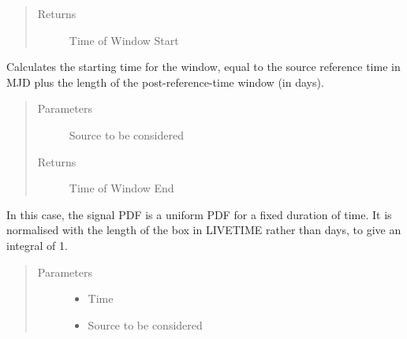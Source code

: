 \documentclass[letterpaper,10pt,english]{sphinxmanual}
\begin{document}
\begin{fulllineitems}
\begin{fulllineitems}
\begin{quote}
\begin{description}
\item[{Returns}] \leavevmode
Time of Window Start

\end{description}\end{quote}

\end{fulllineitems}


\begin{fulllineitems}
\label{\detokenize{index:flarestack.core.time_pdf.Box.sig_t1}}
Calculates the starting time for the window, equal to the
source reference time in MJD plus the length of the post-reference-time
window (in days).
\begin{quote}\begin{description}
\item[{Parameters}] \leavevmode
{} \textendash{} Source to be considered

\item[{Returns}] \leavevmode
Time of Window End

\end{description}\end{quote}

\end{fulllineitems}


\begin{fulllineitems}
\label{\detokenize{index:flarestack.core.time_pdf.Box.signal_f}}
In this case, the signal PDF is a uniform PDF for a fixed duration of
time. It is normalised with the length of the box in LIVETIME rather
than days, to give an integral of 1.
\begin{quote}\begin{description}
\item[{Parameters}] \leavevmode\begin{itemize}
\item {} 
 \textendash{} Time

\item {} 
 \textendash{} Source to be considered


\end{itemize}
\end{description}
\end{quote}
\end{fulllineitems}
\end{fulllineitems}
\end{document}
